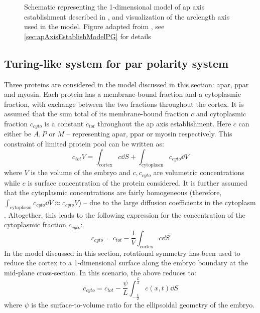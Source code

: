 \begin{figure}
\begin{subfigure}{\textwidth}
    \label{subfig:apAxisEstablishModelPG-arclengthMidplaneBoundary}
\end{subfigure}
\caption[Schematic representing the \acs{ap} axis establishment model in \cite{gross2019guiding}]{Schematic representing the 1-dimensional model of \acs{ap} axis establishment described in \cite{gross2019guiding}, and visualization of the arclength axis used in the model. Figure adapted froim \cite{gross2019guiding}, see \autoref{sec:apAxisEstablishModelPG} for details}
\label{fig:apAxisEstablishModelPG}
\end{figure}

\subsection{Turing-like system for \acs{par} polarity system}\label{subsec:parPolarityReactionDiffusionAdvectionModelPG}
Three proteins are considered in the model discussed in this section: \ac{apar}, \ac{ppar} and myosin. Each protein has a membrane-bound fraction and a cytoplasmic fraction, with exchange between the two fractions throughout the cortex. It is assumed that the sum total of its membrane-bound fraction $c$ and cytoplasmic fraction $c_{cyto}$ is a constant $c_{tot}$ throughout the \ac{ap} axis establishment. Here $c$ can either be $A,P$ or $M$ -- representing \ac{apar}, \ac{ppar} or myosin respectively. This constraint of limited protein pool can be written as:
\begin{equation}
    c_{tot} V = \int_{\textrm{cortex}} c \dd{S} + \int_{\textrm{cytoplasm}} c_{cyto} \dd{V}
\end{equation}
where $V$ is the volume of the embryo and $c, c_{cyto}$ are volumetric concentrations while $c$ is surface concentration of the protein considered. It is further assumed that the cytoplasmic concentrations are fairly homogeneous (therefore, $\int_{\textrm{cytoplasm}} c_{cyto} \dd{V} \approx c_{cyto} V$)  -- due to the large diffusion coefficients in the cytoplasm \citep{goehring2011proteins}. Altogether, this leads to the following expression for the concentration of the cytoplasmic fraction $c_{cyto}$:
\begin{equation}
    c_{cyto} = c_{tot} - \frac{1}{V}\int_{\textrm{cortex}} c \dd{S}
\end{equation}
In the model discussed in this section, rotational symmetry has been used to reduce the cortex to a 1-dimensional surface along the embryo boundary at the mid-plane cross-section. In this scenario, the above reduces to:
\begin{equation}\label{eq:concCytoModelPG}
    c_{cyto} = c_{tot} - \frac{\psi}{L}\int^{\frac{L}{2}}_{-\frac{L}{2}} c(x,t) \dd{S}
\end{equation}
where $\psi$ is the surface-to-volume ratio for the ellipsoidal geometry of the embryo.

